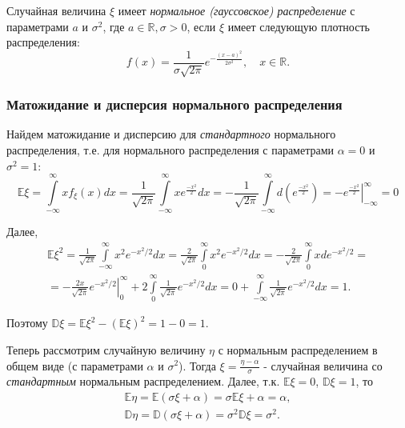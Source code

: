 \begin{defn}
    Случайная величина $\xi$ имеет {\it нормальное (гауссовское) распределение} с параметрами $a$ и $\sigma^2$, где $a \in \mathbb{R}, \sigma > 0$, если $\xi$ имеет следующую плотность распределения: 
$$f(x)=\frac{1}{\sigma \sqrt{2 \pi}} e^{-\frac{(x-a)^{2}}{2 \sigma^{2}}}, \quad x \in \mathbb{R}.$$
\end{defn}

\subsubsection{Матожидание и дисперсия нормального распределения}

Найдем матожидание и дисперсию для {\it стандартного} нормального распределения, т.е. для нормального распределения с параметрами $\alpha = 0$ и $\sigma^2 = 1$:
\begin{equation*}
    \mathbb{E}\xi = 
    \int\limits_{-\infty}^{\infty} x f_{\xi}(x) dx =
    \frac{1}{\sqrt{2\pi}} \int\limits_{-\infty}^{\infty} x e^{\frac{-x^2}{2}} dx = 
    -\frac{1}{\sqrt{2\pi}} \int\limits_{-\infty}^{\infty} d\left( e^{\frac{-x^2}{2}}\right) = 
    \left. -e^{\frac{-x^2}{2}}\right|_{-\infty}^{\infty} = 0
\end{equation*}

Далее, 
\begin{multline*}
    \mathbb{E} \xi^{2}=\frac{1}{\sqrt{2 \pi}} \int\limits_{-\infty}^{\infty} x^{2} e^{-x^{2} / 2} d x=\frac{2}{\sqrt{2 \pi}} \int\limits_{0}^{\infty} x^{2} e^{-x^{2} / 2} d x=-\frac{2}{\sqrt{2 \pi}} \int\limits_{0}^{\infty} x d e^{-x^{2} / 2}= \\
    =-\left.\frac{2 x}{\sqrt{2 \pi}} e^{-x^{2} / 2}\right|_{0} ^{\infty}+2 \int\limits_{0}^{\infty} \frac{1}{\sqrt{2 \pi}} e^{-x^{2} / 2} d x=0+\int\limits_{-\infty}^{\infty} \frac{1}{\sqrt{2 \pi}} e^{-x^{2} / 2} d x=1.
\end{multline*}

Поэтому $\mathbb{D}\xi = \mathbb{E}\xi^2 - (\mathbb{E}\xi)^2 = 1 - 0 = 1.$

Теперь рассмотрим случайную величину $\eta$ с нормальным распределением в общем виде (с параметрами $\alpha$ и $\sigma^2$). Тогда $\xi = \frac{\eta - \alpha}{\sigma}$ - случайная величина со {\it стандартным} нормальным распределением. Далее, т.к. $\mathbb{E}\xi = 0$, $\mathbb{D}\xi = 1$, то 
\begin{gather*}
    \mathbb{E}\eta = \mathbb{E}(\sigma \xi + \alpha) = \sigma \mathbb{E} \xi + \alpha = \alpha, \\
    \mathbb{D}\eta = \mathbb{D}(\sigma \xi + \alpha) = \sigma^2 \mathbb{D}\xi = \sigma^2.
\end{gather*}

